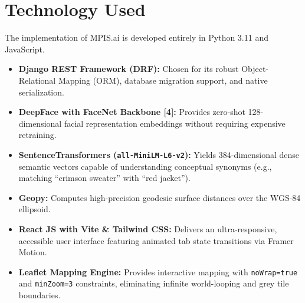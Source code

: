 \documentclass[12pt,a4paper]{report}
\begin{document}
\section{Technology Used}
The implementation of MPIS.ai is developed entirely in Python 3.11 and JavaScript.
\begin{itemize}
    \item \textbf{Django REST Framework (DRF):} Chosen for its robust Object-Relational Mapping (ORM), database migration support, and native serialization.
    \item \textbf{DeepFace with FaceNet Backbone [4]:} Provides zero-shot 128-dimensional facial representation embeddings without requiring expensive retraining.
    \item \textbf{SentenceTransformers (\texttt{all-MiniLM-L6-v2}):} Yields 384-dimensional dense semantic vectors capable of understanding conceptual synonyms (e.g., matching ``crimson sweater'' with ``red jacket'').
    \item \textbf{Geopy:} Computes high-precision geodesic surface distances over the WGS-84 ellipsoid.
    \item \textbf{React JS with Vite \& Tailwind CSS:} Delivers an ultra-responsive, accessible user interface featuring animated tab state transitions via Framer Motion.
    \item \textbf{Leaflet Mapping Engine:} Provides interactive mapping with \texttt{noWrap=true} and \texttt{minZoom=3} constraints, eliminating infinite world-looping and grey tile boundaries.
\end{itemize}
\end{document}
